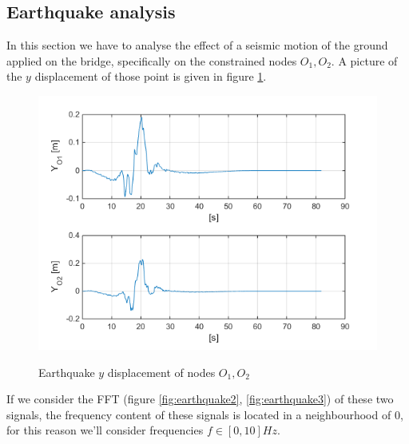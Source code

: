 \documentclass[10pt,a4paper,final]{report}
\begin{document}
\newpage
\subsection{Earthquake analysis}
In this section we have to analyse the effect of a seismic motion of the ground applied on the bridge, specifically on the constrained nodes $O_1, O_2$. A picture of the $y$ displacement of those point is given in figure  \ref{fig:earthquake1}.

\begin{figure}[h]
\centering
\includegraphics[scale=0.8]{earthquake1}
\label{fig:earthquake1}
\caption{Earthquake $y$ displacement of nodes $O_1,O_2$}
\end{figure}
If we consider the FFT (figure \ref{fig:earthquake2}, \ref{fig:earthquake3}) of these two signals, the frequency content of these signals is located in a neighbourhood of $0$, for this reason we'll consider frequencies $f \in [0,10] Hz$.
\end{document}
